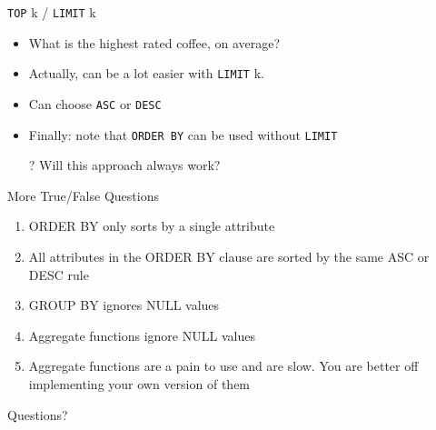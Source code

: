 \documentclass[aspectratio=169]{beamer}
\begin{document}
\begin{frame}[fragile]{\texttt{TOP} k / \texttt{LIMIT} k}

\begin{itemize}
\item What is the highest rated coffee, on average?
\item Actually, can be a lot easier with \texttt{LIMIT} k.
\end{itemize}

\begin{itemize}
	\item Can choose \texttt{ASC} or \texttt{DESC}
	\item Finally: note that \texttt{ORDER BY} can be used without \texttt{LIMIT}
	\item[]
	\item[?] Will this approach always work?
\end{itemize}
\end{frame}
\begin{frame}{More True/False Questions}

\begin{enumerate}
\item ORDER BY only sorts by a single attribute %
\item All attributes in the ORDER BY clause are sorted by the same ASC or DESC rule %
\item GROUP BY ignores NULL values %
\item Aggregate functions ignore NULL values  %
\item Aggregate functions are a pain to use and are slow. You are better off implementing your own version of them %

\end{enumerate}

\end{frame}

\begin{frame}{Questions?}
\end{frame}
\end{document}
